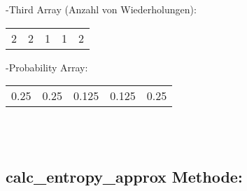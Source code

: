 \documentclass[11pt]{article}
\begin{document}
{{{\begin{large}
{\large -Third Array (Anzahl von Wiederholungen): } \\
\begin{Large}


\begin{tabular}{l|l|l|l|l}
\hline 
2 & 2 & 1 & 1 & 2\\

\end{tabular}
\end{Large}

{\large -Probability Array:} \\
\begin{Large}


\begin{tabular}{l|l|l|l|l}
\hline 
0.25 & 0.25 & 0.125 & 0.125 & 0.25\\

\end{tabular}
 \\\\
\end{Large}






\end{large}

\begin{large}
\subsection{calc\_entropy\_approx Methode:}


\end{large}}}}
\end{document}
